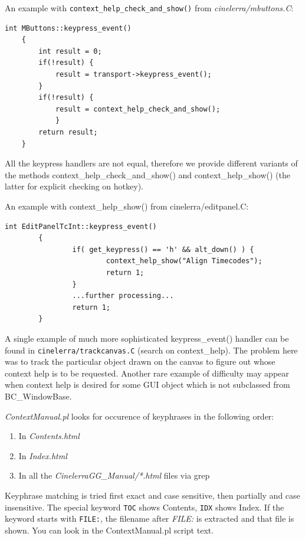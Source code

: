 An example with \texttt{context\_help\_check\_and\_show()} from \textit{cinelerra/mbuttons.C}:
\begin{lstlisting}[style=sh]
	int MButtons::keypress_event()
	{
	    int result = 0;
	    if(!result) {
	        result = transport->keypress_event();
	    }
	    if(!result) {
        	result = context_help_check_and_show();
            }
	    return result;
	}
\end{lstlisting}

All the keypress handlers are not equal, therefore we provide different variants of the methods context\_help\_check\_and\_show() and context\_help\_show() (the latter for explicit checking on hotkey).

An example with context\_help\_show() from cinelerra/editpanel.C:
\begin{lstlisting}[style=sh]
        int EditPanelTcInt::keypress_event()
        {
                if( get_keypress() == 'h' && alt_down() ) {
                        context_help_show("Align Timecodes");
                        return 1;
                }
                ...further processing...
                return 1;
        }
\end{lstlisting}

A single example of much more sophisticated keypress\_event() handler can be found in \texttt{cinelerra/trackcanvas.C} (search on context\_help). The problem here was to track the particular object drawn on the canvas to figure out whose context help is to be requested. Another rare example of difficulty may appear when context help is desired for some GUI object which is not subclassed from BC\_WindowBase.

\textit{ContextManual.pl} looks for occurence of keyphrases in the following order:

\begin{enumerate}
        \item In \textit{Contents.html}
        \item In \textit{Index.html}
        \item In all the \textit{CinelerraGG\_Manual/*.html} files via grep
\end{enumerate}

Keyphrase matching is tried first exact and case sensitive, then partially and case insensitive. The special keyword \texttt{TOC} shows Contents, \texttt{IDX} shows Index. If the keyword starts with \texttt{FILE:}, the filename after \textit{FILE:} is extracted and that file is shown. You can look in the ContextManual.pl script text.


